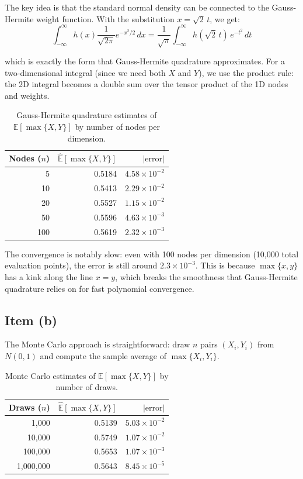 \documentclass{article}
\begin{document}
The key idea is that the standard normal density can be connected to the Gauss-Hermite weight function. With the substitution $x = \sqrt{2}\,t$, we get:
$$
\int_{-\infty}^{\infty} h(x) \frac{1}{\sqrt{2\pi}} e^{-x^2/2} \, dx = \frac{1}{\sqrt{\pi}} \int_{-\infty}^{\infty} h(\sqrt{2}\,t) \, e^{-t^2} \, dt
$$

\noindent which is exactly the form that Gauss-Hermite quadrature approximates. For a two-dimensional integral (since we need both $X$ and $Y$), we use the product rule: the 2D integral becomes a double sum over the tensor product of the 1D nodes and weights.

\begin{table}[h!]
\centering
\begin{tabular}{rrr}
    \toprule
    Nodes ($n$) & $\hat{\mathbb{E}}[\max\{X,Y\}]$ & $|\text{error}|$ \\
    \midrule
    5   & 0.5184 & $4.58 \times 10^{-2}$ \\
    10  & 0.5413 & $2.29 \times 10^{-2}$ \\
    20  & 0.5527 & $1.15 \times 10^{-2}$ \\
    50  & 0.5596 & $4.63 \times 10^{-3}$ \\
    100 & 0.5619 & $2.32 \times 10^{-3}$ \\
    \bottomrule
\end{tabular}
\caption{Gauss-Hermite quadrature estimates of $\mathbb{E}[\max\{X,Y\}]$ by number of nodes per dimension.}
\label{tab:q3_gh}
\end{table}

The convergence is notably slow: even with 100 nodes per dimension (10,000 total evaluation points), the error is still around $2.3 \times 10^{-3}$. This is because $\max\{x, y\}$ has a kink along the line $x = y$, which breaks the smoothness that Gauss-Hermite quadrature relies on for fast polynomial convergence.

\subsection*{Item (b)}

The Monte Carlo approach is straightforward: draw $n$ pairs $(X_i, Y_i)$ from $N(0,1)$ and compute the sample average of $\max\{X_i, Y_i\}$.

\begin{table}[h!]
\centering
\begin{tabular}{rrr}
    \toprule
    Draws ($n$) & $\hat{\mathbb{E}}[\max\{X,Y\}]$ & $|\text{error}|$ \\
    \midrule
    1,000     & 0.5139 & $5.03 \times 10^{-2}$ \\
    10,000    & 0.5749 & $1.07 \times 10^{-2}$ \\
    100,000   & 0.5653 & $1.07 \times 10^{-3}$ \\
    1,000,000 & 0.5643 & $8.45 \times 10^{-5}$ \\
    \bottomrule
\end{tabular}
\caption{Monte Carlo estimates of $\mathbb{E}[\max\{X,Y\}]$ by number of draws.}
\label{tab:q3_mc}
\end{table}
\end{document}
